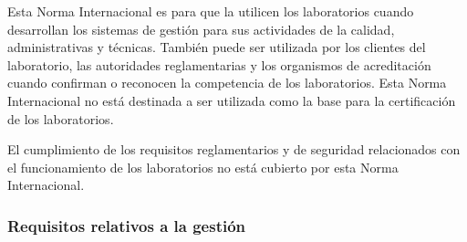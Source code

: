 \par \noindent
Esta Norma Internacional es para que la utilicen los laboratorios cuando desarrollan los sistemas de
gestión para sus actividades de la calidad, administrativas y técnicas. También puede ser utilizada por los clientes del laboratorio, las autoridades reglamentarias y los organismos de acreditación cuando confirman o reconocen la competencia de los laboratorios. Esta Norma Internacional no está destinada a ser utilizada
como la base para la certificación de los laboratorios.

\par \noindent
El cumplimiento de los requisitos reglamentarios y de seguridad relacionados con el funcionamiento de
los laboratorios no está cubierto por esta Norma Internacional.

\subsubsection{Requisitos relativos a la gestión}

